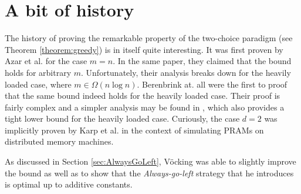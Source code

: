 \documentclass[a4paper,12pt]{article}
\begin{document}
\section{A bit of history}
\label{sec:historyOfGreedy}
The history of proving the remarkable property of the two-choice paradigm (see Theorem \ref{theorem:greedy}) is in itself quite interesting. It was first proven by Azar et al. \cite{ABKU99} for the case $m = n$. In the same paper, they claimed that the bound holds for arbitrary $m$. Unfortunately, their analysis breaks down for the heavily loaded case, where $m \in \Omega\left(n  \log n\right)$. Berenbrink at. all \cite{BFZR08} were the first to proof that the same bound indeed holds for the heavily loaded case. Their proof is fairly complex and a simpler analysis may be found in \cite{TW13}, which also provides a tight lower bound for the heavily loaded case. Curiously, the case $d = 2$ was implicitly proven by Karp et al. in the context of simulating PRAMs on distributed memory machines\cite{KLM92}.

As discussed in Section \ref{sec:AlwaysGoLeft}, V\"ocking \cite{VOC03} was able to slightly improve the bound as well as to show that the \emph{Always-go-left} strategy that he introduces is optimal up to additive constants.



 
\end{document}
